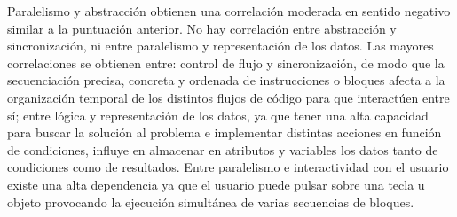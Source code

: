 \documentclass[a4paper, 12pt]{book}
\begin{document}
Paralelismo y abstracción obtienen una correlación moderada en sentido negativo similar a la puntuación anterior. No hay correlación entre abstracción y sincronización, ni entre paralelismo y representación de los datos. Las mayores correlaciones se obtienen entre: control de flujo y sincronización, de modo que la secuenciación precisa, concreta y ordenada de instrucciones o bloques afecta a la organización temporal de los distintos flujos de código para que interactúen entre sí; entre lógica y representación de los datos, ya que tener una alta capacidad para buscar la solución al problema e implementar distintas acciones en función de condiciones, influye en almacenar en atributos y variables los datos tanto de condiciones como de resultados. Entre paralelismo e interactividad con el usuario existe una alta  dependencia ya que el usuario puede pulsar sobre una tecla u objeto provocando la ejecución simultánea de varias secuencias de bloques.%
\end{document}
